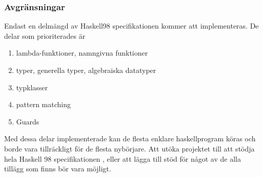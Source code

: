 \subsubsection{Avgränsningar}
Endast en delmängd av Haskell98 specifikationen kommer att implementeras. De delar som prioriterades är
        \begin{enumerate}
            \item{lambda-funktioner, namngivna funktioner}
            \item{typer, generella typer, algebraiska datatyper}
            \item{typklasser}
            \item{pattern matching}
            \item{Guards}
            \end{enumerate}
Med dessa delar implementerade kan de flesta enklare haskellprogram köras och borde vara tillräckligt för de flesta nybörjare. Att utöka projektet till att stödja hela Haskell 98 specifikationen \citep{haskell98}, eller att lägga till stöd för något av de alla tillägg som finns bör vara möjligt.
